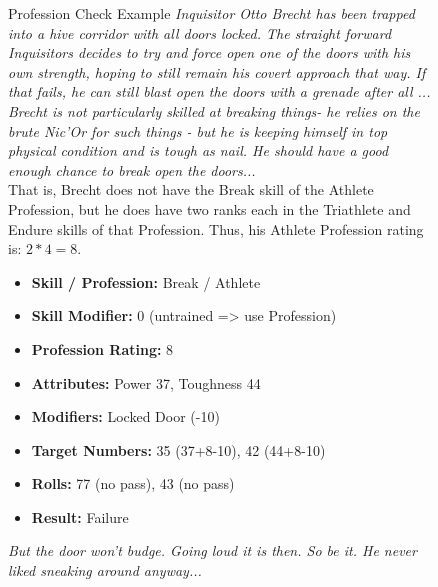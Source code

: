 \begin{figure}[hb]
	\begin{DndSidebar}{Profession Check Example}
	\textit{Inquisitor Otto Brecht has been trapped into a hive corridor with all doors locked. The straight forward Inquisitors decides to try and force open one of the doors with his own strength, hoping to still remain his covert approach that way. If that fails, he can still blast open the doors with a grenade after all ...\\
	Brecht is not particularly skilled at breaking things- he relies on the brute Nic'Or for such things - but he is keeping himself in top physical condition and is tough as nail. He should have a good enough chance to break open the doors...}\\
	That is, Brecht does not have the Break skill of the Athlete Profession, but he does have two ranks each in the Triathlete and Endure skills of that Profession. Thus, his Athlete Profession rating is: $2*4=8$.
		\begin{itemize}
		\item \textbf{Skill / Profession:} Break / Athlete
		\item \textbf{Skill Modifier:} 0 (untrained => use Profession)
		\item \textbf{Profession Rating:} 8
		\item \textbf{Attributes:} Power 37, Toughness 44
		\item \textbf{Modifiers:} Locked Door (-10)
		\item \textbf{Target Numbers:} 35 (37+8-10), 42 (44+8-10)
		\item \textbf{Rolls:} 77 (no pass), 43 (no pass)
		\item \textbf{Result:} Failure
	\end{itemize}
	\textit{But the door won't budge. Going loud it is then. So be it. He never liked sneaking around anyway...}
	\end{DndSidebar}
\end{figure}


